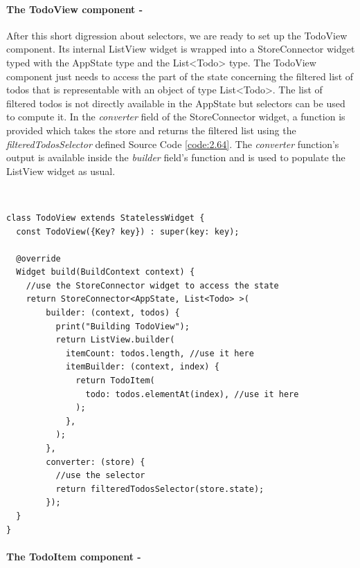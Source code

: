 \paragraph{The TodoView component - }
\label{subpar:todo_app_bloc_core_state}
After this short digression about selectors, we are ready to set up the TodoView component. Its internal ListView widget is wrapped into a StoreConnector widget typed with the AppState type and the List<Todo> type. The TodoView component just needs to access the part of the state concerning the filtered list of todos that is representable with an object of type List<Todo>. The list of filtered todos is not directly available in the AppState but selectors can be used to compute it. In the \textit{converter }field of the StoreConnector widget, a function is provided which takes the store and returns the filtered list using the \textit{filteredTodosSelector} defined Source Code \ref{code:2.64}. The \textit{converter} function's output is available inside the \textit{builder} field's function and is used to populate the ListView widget as usual. 
\begin{code}
\mbox{}\\
 \mbox{}
		\label{code:2.14}
\begin{verbatim}
class TodoView extends StatelessWidget {
  const TodoView({Key? key}) : super(key: key);

  @override
  Widget build(BuildContext context) {
    //use the StoreConnector widget to access the state
    return StoreConnector<AppState, List<Todo> >(
        builder: (context, todos) {
          print("Building TodoView");
          return ListView.builder(
            itemCount: todos.length, //use it here
            itemBuilder: (context, index) {
              return TodoItem(
                todo: todos.elementAt(index), //use it here
              );
            },
          );
        },
        converter: (store) {
          //use the selector
          return filteredTodosSelector(store.state);
        });
  }
}
\end{verbatim}
\mbox{}
\end{code}

\paragraph{The TodoItem component - }
\label{subpar:todo_app_bloc_core_state}

